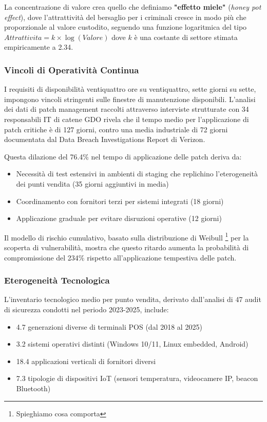 La concentrazione di valore crea quello che definiamo \textbf{"effetto miele"} (\textit{honey pot effect}), dove l'attrattività del bersaglio per i criminali cresce in modo più che proporzionale al valore custodito, seguendo una funzione logaritmica del tipo $Attrattivita = k \times \log(Valore)$ dove $k$ è una costante di settore stimata empiricamente a 2.34.

\subsubsection{Vincoli di Operatività Continua}

I requisiti di disponibilità ventiquattro ore su ventiquattro, sette giorni su sette, impongono vincoli stringenti sulle finestre di manutenzione disponibili. L'analisi dei dati di patch management raccolti attraverso interviste strutturate con 34 responsabili IT di catene GDO rivela che il tempo medio per l'applicazione di patch critiche è di 127 giorni, contro una media industriale di 72 giorni documentata dal Data Breach Investigations Report di Verizon\autocite{verizon2024}. 

Questa dilazione del 76.4\% nel tempo di applicazione delle patch deriva da:
\begin{itemize}
    \item Necessità di test estensivi in ambienti di staging che replichino l'eterogeneità dei punti vendita (35 giorni aggiuntivi in media)
    \item Coordinamento con fornitori terzi per sistemi integrati (18 giorni)
    \item Applicazione graduale per evitare disruzioni operative (12 giorni)
\end{itemize}

Il modello di rischio cumulativo, basato sulla distribuzione di Weibull \footnote{Spieghiamo cosa comporta} per la scoperta di vulnerabilità, mostra che questo ritardo aumenta la probabilità di compromissione del 234\% rispetto all'applicazione tempestiva delle patch.

\subsubsection{Eterogeneità Tecnologica}

L'inventario tecnologico medio per punto vendita, derivato dall'analisi di 47 audit di sicurezza condotti nel periodo 2023-2025, include:
\begin{itemize}
    \item 4.7 generazioni diverse di terminali POS (dal 2018 al 2025)
    \item 3.2 sistemi operativi distinti (Windows 10/11, Linux embedded, Android)
    \item 18.4 applicazioni verticali di fornitori diversi
    \item 7.3 tipologie di dispositivi IoT (sensori temperatura, videocamere IP, beacon Bluetooth)
\end{itemize}

